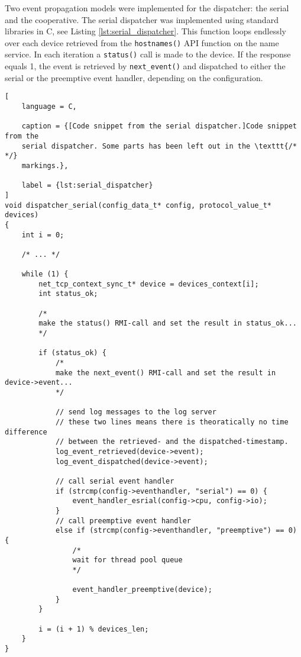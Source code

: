 Two event propagation models were implemented for the dispatcher: the serial
and the cooperative. The serial dispatcher was implemented using standard
libraries in C, see Listing \ref{lst:serial_dispatcher}. This function loops
endlessly over each device retrieved from the \texttt{hostnames()} API function
on the name service. In each iteration a \texttt{status()} call is made to the
device. If the response equals 1, the event is retrieved by
\texttt{next\_event()} and dispatched to either the serial or the preemptive
event handler, depending on the configuration.

\begin{lstlisting}[
    language = C,

    caption = {[Code snippet from the serial dispatcher.]Code snippet from the
    serial dispatcher. Some parts has been left out in the \texttt{/* */}
    markings.},

    label = {lst:serial_dispatcher}
]
void dispatcher_serial(config_data_t* config, protocol_value_t* devices)
{
    int i = 0;

    /* ... */

    while (1) {
        net_tcp_context_sync_t* device = devices_context[i];
        int status_ok;

        /*
        make the status() RMI-call and set the result in status_ok...
        */

        if (status_ok) {
            /*
            make the next_event() RMI-call and set the result in device->event...
            */

            // send log messages to the log server
            // these two lines means there is theoratically no time difference
            // between the retrieved- and the dispatched-timestamp.
            log_event_retrieved(device->event);
            log_event_dispatched(device->event);

            // call serial event handler
            if (strcmp(config->eventhandler, "serial") == 0) {
                event_handler_esrial(config->cpu, config->io);
            }
            // call preemptive event handler
            else if (strcmp(config->eventhandler, "preemptive") == 0) {
                /*
                wait for thread pool queue
                */

                event_handler_preemptive(device);
            }
        }

        i = (i + 1) % devices_len;
    }
}
\end{lstlisting}

